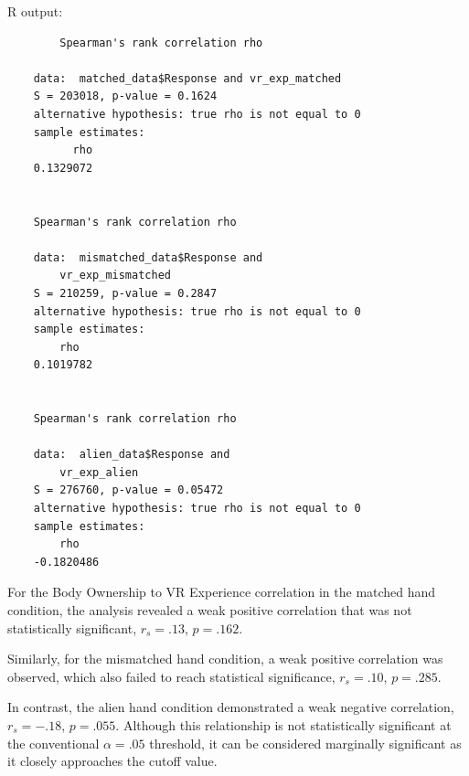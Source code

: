 \begin{itemize}
{\begin{verbatim}
	    \end{verbatim}

	    R output:
	    \begin{verbatim}
		Spearman's rank correlation rho

	data:  matched_data$Response and vr_exp_matched
	S = 203018, p-value = 0.1624
	alternative hypothesis: true rho is not equal to 0
	sample estimates:
	      rho 
	0.1329072 


	Spearman's rank correlation rho

    data:  mismatched_data$Response and
        vr_exp_mismatched
    S = 210259, p-value = 0.2847
    alternative hypothesis: true rho is not equal to 0
    sample estimates:
        rho 
    0.1019782 


    Spearman's rank correlation rho

    data:  alien_data$Response and
        vr_exp_alien
    S = 276760, p-value = 0.05472
    alternative hypothesis: true rho is not equal to 0
    sample estimates:
        rho 
    -0.1820486 
    \end{verbatim}
    
    For the Body Ownership to VR Experience correlation in the matched hand condition, the analysis revealed a weak positive correlation that was not statistically significant, $r_s = .13$, $p = .162$.

Similarly, for the mismatched hand condition, a weak positive correlation was observed, which also failed to reach statistical significance, $r_s = .10$, $p = .285$.

In contrast, the alien hand condition demonstrated a weak negative correlation, $r_s = -.18$, $p = .055$. Although this relationship is not statistically significant at the conventional $\alpha = .05$ threshold, it can be considered marginally significant as it closely approaches the cutoff value.}
\end{itemize}
